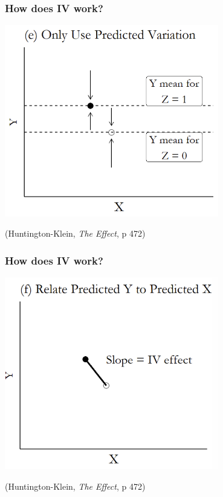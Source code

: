 \documentclass[aspectratio=43]{beamer}
\begin{document}
\begin{frame}
\frametitle{How does IV work?}
\centering

\includegraphics[width = 0.7\textwidth]{../img/ivlogic5}

{\scriptsize (Huntington-Klein, \textit{The Effect}, p 472)}
\end{frame}

\begin{frame}
\frametitle{How does IV work?}
\centering

\includegraphics[width = 0.7\textwidth]{../img/ivlogic6}

{\scriptsize (Huntington-Klein, \textit{The Effect}, p 472)}
\end{frame}
\end{document}
